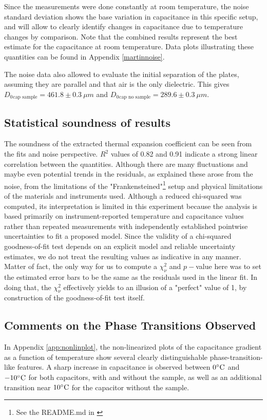 \documentclass[letterpaper,12pt]{article}
\begin{document}
Since the measurements were done constantly at room temperature, the noise standard deviation shows the base variation in capacitance in this specific setup, and will allow to clearly identify changes in capacitance due to temperature changes by comparison. Note that the combined results represent the best estimate for the capacitance at room temperature. Data plots illustrating these quantities can be found in Appendix \ref{martinnoise}.

The noise data also allowed to evaluate the initial separation of the plates, assuming they are parallel and that air is the only dielectric. This gives $D_0{_{\text{cap\ sample} }} = 461.8 \pm 0.3\ \mu m$ and $D_0{_{\text{cap\ no\ sample}}} = 289.6 \pm 0.3\ \mu m$.
\subsection{Statistical soundness of results}
The soundness of the extracted thermal expansion coefficient can be seen from the fits and noise perspective. $R^2$ values of 0.82 and 0.91 indicate a strong linear correlation between the quantities. Although there are many fluctuations and maybe even potential trends in the residuals, as explained these arose from the noise, from the limitations of the "Frankensteined"\footnote{See the README.md in \cite{github_link}} setup and physical limitations of the materials and instruments used. Although a reduced chi-squared was computed, its interpretation is limited in this experiment because the analysis is based primarily on instrument-reported temperature and capacitance values rather than repeated measurements with independently established pointwise uncertainties to fit a proposed model. Since the validity of a chi-squared goodness-of-fit test depends on an explicit model and reliable uncertainty estimates, we do not treat the resulting values as indicative in any manner. Matter of fact, the only way for us to compute a $\chi^2_{\nu}$ and $p-$value here was to set the estimated error bars to be the same as the residuals used in the linear fit. In doing that, the $\chi^2_{\nu}$ effectively yields to an illusion of a "perfect" value of 1, by construction of the goodness-of-fit test itself. \cite{textbook1}

\subsection{Comments on the Phase Transitions Observed}

In Appendix \ref{app:nonlinplot}, the non-linearized plots of the capacitance gradient as a function of temperature show several clearly distinguishable phase-transition-like features. A sharp increase in capacitance is observed between $0\degree \text{C}$ and $-10\degree \text{C}$ for both capacitors, with and without the sample, as well as an additional transition near $10\degree \text{C}$ for the capacitor without the sample.
\end{document}
